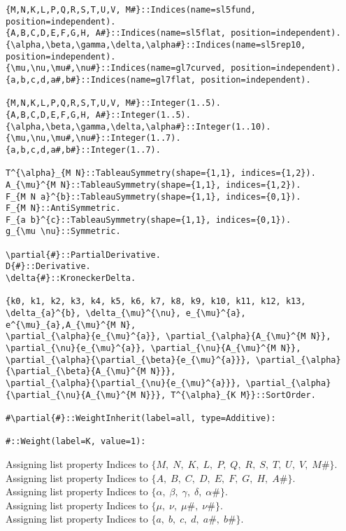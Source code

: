 \documentclass[11pt]{article}
\begin{document}
{\color[named]{Blue}\begin{verbatim}
{M,N,K,L,P,Q,R,S,T,U,V, M#}::Indices(name=sl5fund, position=independent).
{A,B,C,D,E,F,G,H, A#}::Indices(name=sl5flat, position=independent).
{\alpha,\beta,\gamma,\delta,\alpha#}::Indices(name=sl5rep10, position=independent).
{\mu,\nu,\mu#,\nu#}::Indices(name=gl7curved, position=independent).
{a,b,c,d,a#,b#}::Indices(name=gl7flat, position=independent).

{M,N,K,L,P,Q,R,S,T,U,V, M#}::Integer(1..5).
{A,B,C,D,E,F,G,H, A#}::Integer(1..5).
{\alpha,\beta,\gamma,\delta,\alpha#}::Integer(1..10).
{\mu,\nu,\mu#,\nu#}::Integer(1..7).
{a,b,c,d,a#,b#}::Integer(1..7).

T^{\alpha}_{M N}::TableauSymmetry(shape={1,1}, indices={1,2}).
A_{\mu}^{M N}::TableauSymmetry(shape={1,1}, indices={1,2}).
F_{M N a}^{b}::TableauSymmetry(shape={1,1}, indices={0,1}).
F_{M N}::AntiSymmetric.
F_{a b}^{c}::TableauSymmetry(shape={1,1}, indices={0,1}).
g_{\mu \nu}::Symmetric.

\partial{#}::PartialDerivative.
D{#}::Derivative.
\delta{#}::KroneckerDelta.

{k0, k1, k2, k3, k4, k5, k6, k7, k8, k9, k10, k11, k12, k13, \delta_{a}^{b}, \delta_{\mu}^{\nu}, e_{\mu}^{a}, e^{\mu}_{a},A_{\mu}^{M N},
\partial_{\alpha}{e_{\mu}^{a}}, \partial_{\alpha}{A_{\mu}^{M N}}, \partial_{\nu}{e_{\mu}^{a}}, \partial_{\nu}{A_{\mu}^{M N}}, 
\partial_{\alpha}{\partial_{\beta}{e_{\mu}^{a}}}, \partial_{\alpha}{\partial_{\beta}{A_{\mu}^{M N}}},
\partial_{\alpha}{\partial_{\nu}{e_{\mu}^{a}}}, \partial_{\alpha}{\partial_{\nu}{A_{\mu}^{M N}}}, T^{\alpha}_{K M}}::SortOrder.

#\partial{#}::WeightInherit(label=all, type=Additive):

#::Weight(label=K, value=1):
\end{verbatim}}
Assigning list property Indices to $\{M,\; N,\; K,\; L,\; P,\; Q,\; R,\; S,\; T,\; U,\; V,\; M\#\}$.
\\
Assigning list property Indices to $\{A,\; B,\; C,\; D,\; E,\; F,\; G,\; H,\; A\#\}$.
\\
Assigning list property Indices to $\{\alpha,\; \beta,\; \gamma,\; \delta,\; \alpha\#\}$.
\\
Assigning list property Indices to $\{\mu,\; \nu,\; \mu\#,\; \nu\#\}$.
\\
Assigning list property Indices to $\{a,\; b,\; c,\; d,\; a\#,\; b\#\}$.
\end{document}
